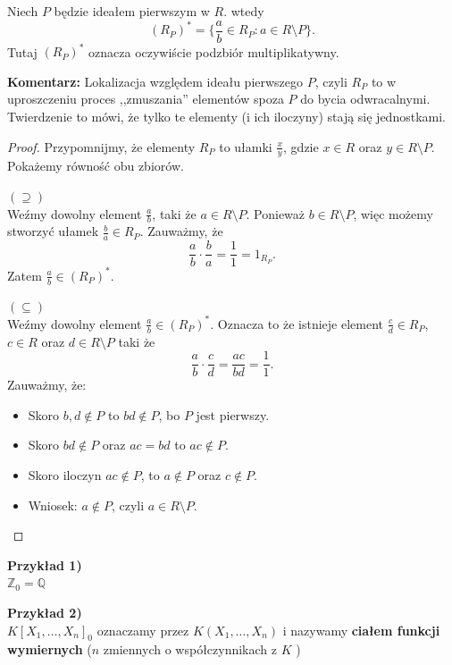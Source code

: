 \begin{theorem}
	Niech $P$ będzie ideałem pierwszym w $R$. wtedy
	\[
		\left( R_{P}\right)^{\ast} = \{\frac{a}{b}\in R_{P}: a \in R\setminus P\} 
	.\]
	Tutaj $\left( R_{P} \right)^{\ast}$ oznacza oczywiście podzbiór multiplikatywny.
\end{theorem} 
\noindent \textbf{Komentarz:} Lokalizacja względem ideału pierwszego $P$, czyli $R_{P}$ to w uproszczeniu proces ,,zmuszania'' elementów spoza $P$ do bycia odwracalnymi. Twierdzenie to mówi, że tylko te elementy (i ich iloczyny) stają się jednostkami. 
\begin{proof}
	Przypomnijmy, że elementy $R_{P}$ to ułamki $\frac{x}{y}$, gdzie $x\in R$ oraz $y \in R\setminus P$. Pokażemy równość obu zbiorów.

\noindent $\left( \supseteq  \right) $ \\
Weźmy dowolny element $\frac{a}{b}$, taki że $a \in R\setminus P$. Ponieważ $b \in R\setminus P$, więc możemy stworzyć ułamek $\frac{b}{a}\in R_{P}$. Zauważmy, że \[
\frac{a}{b} \cdot \frac{b}{a} = \frac{1}{1} = 1_{R_{P}}
.\] 
Zatem $\frac{a}{b}\in \left( R_{P} \right) ^{\ast} $.

\noindent $\left( \subseteq  \right) $ \\
Weźmy dowolny element $\frac{a}{b}\in \left( R_{P} \right)^{\ast} $. Oznacza to że istnieje element $\frac{c}{d} \in R_{P}$, $c \in R$ oraz $d \in R\setminus P$ taki że
\[
\frac{a}{b}\cdot \frac{c}{d} = \frac{ac}{bd} = \frac{1}{1}
.\] 
Zauważmy, że:
\begin{itemize}
	\item Skoro $b,d \not\in P$ to $bd \not\in P$, bo $P$ jest pierwszy.
	\item Skoro $bd \not\in P$ oraz $ac = bd$ to  $ac \not\in P$.
	\item Skoro iloczyn $ac \not\in P$, to $a \not\in P$ oraz $c \not\in P$.
	\item Wniosek: $a \not\in P$, czyli $a \in R\setminus P$.
\end{itemize}
\end{proof} 

\noindent \textbf{Przykład 1)}\\
$\mathbb{Z}_{0} = \mathbb{Q}$ 

\noindent \textbf{Przykład 2)}\\
$K\left[ X_1,\ldots,X_{n} \right]_{0}$ oznaczamy przez $K\left( X_1,\ldots,X_{n}  \right) $ i nazywamy \textbf{ciałem funkcji wymiernych} ($n$ zmiennych o współczynnikach z $K$ )

